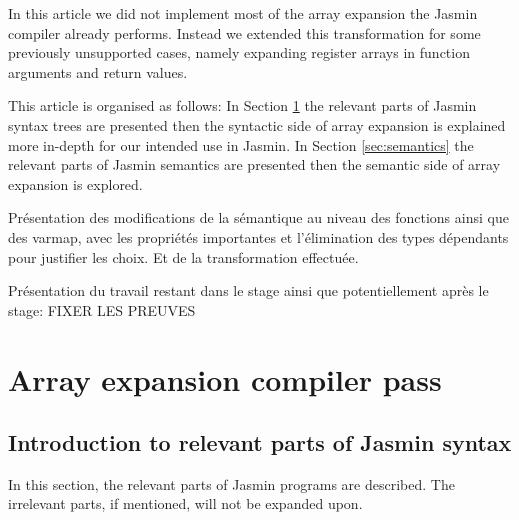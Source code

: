 \documentclass{article}
\begin{document}
\smallskip

In this article we did not implement most of the array expansion the Jasmin
compiler already performs. Instead we extended this transformation for some
previously unsupported cases, namely expanding register arrays in function
arguments and return values. 

\medskip

This article is organised as follows:
In Section \ref{sec:syntax} the relevant parts of Jasmin syntax trees are
presented then the syntactic side of array expansion is explained more in-depth
for our intended use in Jasmin.
In Section \ref{sec:semantics} the relevant parts of Jasmin semantics are
presented then the semantic side of array expansion is explored.

 Présentation des modifications de la sémantique au niveau des fonctions ainsi
 que des varmap, avec les propriétés importantes et l'élimination des types
 dépendants pour justifier les choix. Et de la transformation effectuée.

 Présentation du travail restant dans le stage ainsi que potentiellement après
 le stage: FIXER LES PREUVES


\section{Array expansion compiler pass}\label{sec:syntax}

\subsection{Introduction to relevant parts of Jasmin syntax}

In this section, the relevant parts of Jasmin programs are described. The
irrelevant parts, if mentioned, will not be expanded upon.
\end{document}
